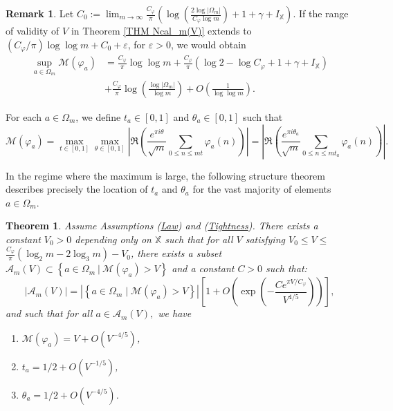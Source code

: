 \documentclass[12pt]{amsart}
\newtheorem{thm}{Theorem}[section]
\theoremstyle{definition}
\newtheorem{rem}{Remark}
\numberwithin{equation}{section}
\numberwithin{equation}{section}
\def\A{\mathcal{A}}
\def\M{\mathcal{M}}
\def\Mcal{\mathcal{M}}
\def\Mp{C_\varphi}
\def\X{\mathbb{X}}
\begin{document}
\begin{rem}
Let $C_0 := \lim_{m\to \infty} \frac{C_\varphi}{\pi}\left(\log \left(\frac{2 \log |\Omega_m| }{\Mp \log m}\right)
+1+\gamma+I_\X\right)$.
If the range of validity of $V$ in Theorem \ref{THM Ncal_m(V)} extends to $ (\Mp/\pi)\log\log m+C_0+\varepsilon$, for $\varepsilon>0$, we would obtain
\begin{align*}\sup_{a\in \Omega_m}\Mcal(\varphi_a)&
= \frac{C_\varphi}{\pi}\log\log m +\frac{C_\varphi}{\pi}\left(\log 2- \log  \Mp 
+1+\gamma+I_\X\right) \\&
+\frac{C_\varphi}{\pi}\log \left(\frac{\log |\Omega_m| }{\log m}\right)
+O\left(\frac{1}{\log\log m}\right).
\end{align*}  

\end{rem}

For each \(a\in \Omega_m\), we define \(t_a \in [0,1]\) and \(\theta_a \in [0,1]\) such that
\[\M(\varphi_a) = 
\max_{t\in[0,1]}\max_{\theta\in[0,1]}\left|\Re\left(
\frac{e^{\pi i\theta}}{\sqrt{m}}\sum_{0\leq n\leq mt} \varphi_a(n)\right)
\right| = \left|\Re\left(
\frac{e^{\pi i\theta_a}}{\sqrt{m}}\sum_{0\leq n\leq m t_a} \varphi_a(n)\right)\right|.
\]

In the regime where the maximum is large, the following structure theorem describes precisely the location of \(t_a\) and \(\theta_a\) for the vast majority of elements \(a\in \Omega_m\).

\begin{thm}\label{thm structure simp} Assume Assumptions (\hyperlink{Ass Law}{Law}) and (\hyperlink{Ass Tightness}{Tightness}). There exists a constant $ V_0>0$ depending only on $\X$ such that for all \(V\) satisfying $V_0\leq V \leq$
$ \frac{\Mp}{\pi}(\log_2 m-2\log_3 m)-V_0$, there exists a subset $\A_m(V)\subset \left\{
a\in \Omega_m\: \big|\:\M(\varphi_a)> V
\right\}$ and a constant $C>0$ such that:
\[
\left|\A_m(V) \right|= \left|\left\{
a\in \Omega_m\;\big|\;\M(\varphi_a)> V
\right\}\right|
\left[1 +O\left(\exp\left(- 
\frac{Ce^{\pi V/\Mp}}{V^{4/5}}
\right)\right)\right],
\]
and such that for all $ a \in \A_m(V),$ we have
\begin{enumerate}
    \item $\M(\varphi_a)=V+ O\left(V^{-4/5}\right)$,
    \item $t_a = 1/2+ O\left(V^{-1/5}\right)$,
    \item $\theta_a = 1/2+ O\left(V^{-4/5}\right)$.
\end{enumerate}

\end{thm}
 
\end{document}
